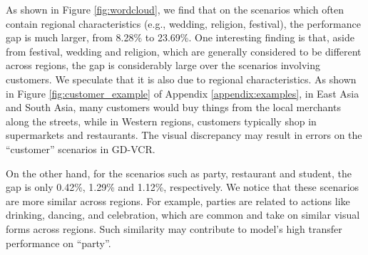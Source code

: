 \documentclass[11pt]{article}
\begin{document}
\begin{table*}[t]
\centering
{}
\caption{VisualBERT's accuracy (\%) on low-order and high-order cognitive QA pairs. ``Gap (West)'' denotes performance gap over the QA pairs of images from Western and non-Western regions. ``'' denotes the performance gap between low-order and high-order cognitive QA pairs from the same regions.}
    \label{tab:reasoning_level}
\end{table*}

As shown in Figure \ref{fig:wordcloud}, we find that on the scenarios which often contain regional characteristics (e.g., wedding, religion, festival), the performance gap is much larger, from 8.28\% to 23.69\%. 
One interesting finding is that, aside from festival, wedding and religion, which are generally considered to be different across regions, the gap is considerably large over the scenarios involving customers. 
We speculate that it is also due to regional characteristics. As shown in Figure \ref{fig:customer_example} of Appendix \ref{appendix:examples}, in East Asia and South Asia, many customers would buy things from the local merchants along the streets, while in Western regions, customers typically shop in supermarkets and restaurants. The visual discrepancy may result in errors on the ``customer'' scenarios in GD-VCR. 

On the other hand, for the scenarios such as party, restaurant and student, the gap is only 0.42\%, 1.29\% and 1.12\%, respectively. We notice that these scenarios are more similar across regions. For example, parties are related to actions like drinking, dancing, and celebration, which are common and take on similar visual forms across regions. Such similarity may contribute to model's high transfer performance on ``party''.
\end{document}
